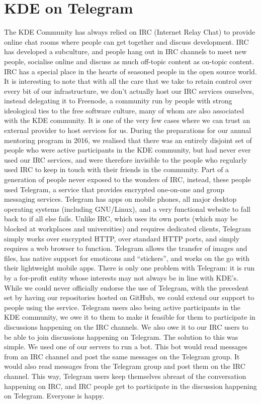\section*{KDE on Telegram}
The KDE Community has always relied on IRC (Internet Relay Chat) to provide online chat rooms where people can get together and discuss development. IRC has developed a subculture, and people hang out in IRC channels to meet new people, socialise online and discuss as much off-topic content as on-topic content. IRC has a special place in the hearts of seasoned people in the open source world.
It is interesting to note that with all the care that we take to retain control over every bit of our infrastructure, we don't actually host our IRC services ourselves, instead delegating it to Freenode, a community run by people with strong ideological ties to the free software culture, many of whom are also associated with the KDE community. It is one of the very few cases where we can trust an external provider to host services for us.
During the preparations for our annual mentoring program in 2016, we realised that there was an entirely disjoint set of people who were active participants in the KDE community, but had never ever used our IRC services, and were therefore invisible to the people who regularly used IRC to keep in touch with their friends in the community.
Part of a generation of people never exposed to the wonders of IRC, instead, these people used Telegram, a service that provides encrypted one-on-one and group messaging services. Telegram has apps on mobile phones, all major desktop operating systems (including GNU/Linux), and a very functional website to fall back to if all else fails. Unlike IRC, which uses its own ports (which may be blocked at workplaces and universities) and requires dedicated clients, Telegram simply works over encrypted HTTP, over standard HTTP ports, and simply requires a web browser to function. Telegram allows the transfer of images and files, has native support for emoticons and “stickers”, and works on the go with their lightweight mobile apps. There is only one problem with Telegram: it is run by a for-profit entity whose interests may not always be in line with KDE's.
While we could never officially endorse the use of Telegram, with the precedent set by having our repositories hosted on GitHub, we could extend our support to people using the service. Telegram users also being active participants in the KDE community, we owe it to them to make it feasible for them to participate in discussions happening on the IRC channels. We also owe it to our IRC users to be able to join discussions happening on Telegram.
The solution to this was simple. We used one of our servers to run a bot. This bot would read messages from an IRC channel and post the same messages on the Telegram group. It would also read messages from the Telegram group and post them on the IRC channel. This way, Telegram users keep themselves abreast of the conversation happening on IRC, and IRC people get to participate in the discussion happening on Telegram. Everyone is happy.

